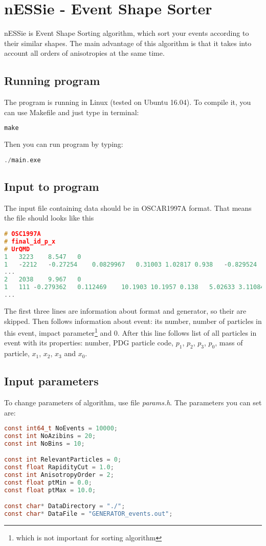\documentclass[a4paper]{article}
\begin{document}
\section*{nESSie - Event Shape Sorter}
nESSie is Event Shape Sorting algorithm, which sort your events according to their similar shapes. The main advantage of this algorithm is that it takes into account all orders of anisotropies at the same time.

\subsection*{Running program}
The program is running in Linux (tested on Ubuntu 16.04). To compile it, you can use Makefile and just type in terminal:
\begin{lstlisting}[language=c]
make
\end{lstlisting}

Then you can run program by typing:
\begin{lstlisting}[language=c]
./main.exe
\end{lstlisting}

\subsection*{Input to program}
The input file containing data should be in OSCAR1997A format. That means the file should looks like this
\begin{lstlisting}[language=c]
# OSC1997A
# final_id_p_x
# UrQMD
1 	3223	8.547	0
1	-2212	-0.27254	0.0829967	0.31003	1.02817	0.938	-0.829524	5.68779	10.2909	32.7802
...
2	2038	9.967	0
1	111	-0.279362	0.112469	10.1903	10.1957	0.138	5.02633	3.11084	199.578	200
...
\end{lstlisting}

The first three lines are information about format and generator, so their are skipped. Then follows information about event: its number, number of particles in this event, impact parameter\footnote{which is not important for sorting algorithm} and $0$.
After this line follows list of all particles in event with its properties: number, PDG particle code, $p_1$, $p_2$, $p_3$, $p_0$, mass of particle, $x_1$, $x_2$, $x_3$ and $x_0$.

\subsection*{Input parameters}

To change parameters of algorithm, use file \textit{params.h}. The parameters you can set are:
\begin{lstlisting}[language=c]
const int64_t NoEvents = 10000;
const int NoAzibins = 20;
const int NoBins = 10;

const int RelevantParticles = 0;
const float RapidityCut = 1.0;
const int AnisotropyOrder = 2;
const float ptMin = 0.0;
const float ptMax = 10.0;

const char* DataDirectory = "./";
const char* DataFile = "GENERATOR_events.out";
\end{lstlisting}
\end{document}
